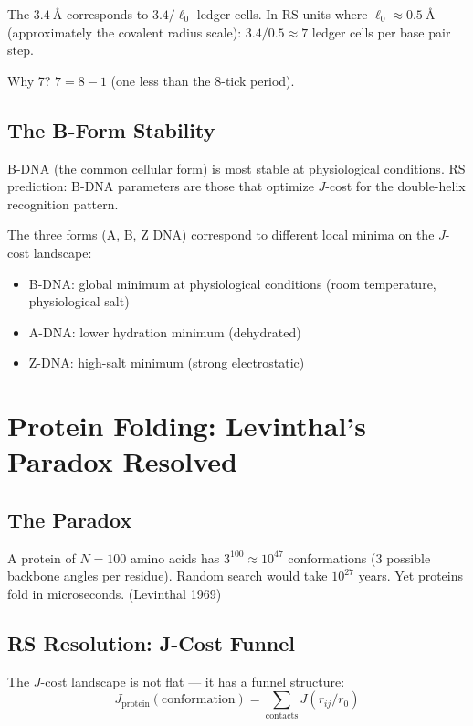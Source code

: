 \documentclass[12pt,a4paper]{article}
\theoremstyle{definition}
\theoremstyle{remark}
\begin{document}
The $3.4~\text{\AA}$ corresponds to $3.4/\ell_0$ ledger cells. In RS units where 
$\ell_0 \approx 0.5~\text{\AA}$ (approximately the covalent radius scale):
$3.4/0.5 \approx 7$ ledger cells per base pair step.

Why 7? $7 = 8 - 1$ (one less than the 8-tick period).

\subsection{The B-Form Stability}

B-DNA (the common cellular form) is most stable at physiological conditions.
RS prediction: B-DNA parameters are those that optimize $J$-cost for the 
double-helix recognition pattern.

The three forms (A, B, Z DNA) correspond to different local minima on the 
$J$-cost landscape:
\begin{itemize}
\item B-DNA: global minimum at physiological conditions (room temperature, physiological salt)
\item A-DNA: lower hydration minimum (dehydrated)
\item Z-DNA: high-salt minimum (strong electrostatic)
\end{itemize}

\section{Protein Folding: Levinthal's Paradox Resolved}

\subsection{The Paradox}

A protein of $N = 100$ amino acids has $3^{100} \approx 10^{47}$ conformations 
(3 possible backbone angles per residue). Random search would take $10^{27}$ years.
Yet proteins fold in microseconds. (Levinthal 1969)

\subsection{RS Resolution: J-Cost Funnel}

The $J$-cost landscape is not flat — it has a funnel structure:
\begin{equation}
J_\mathrm{protein}(\mathrm{conformation}) = \sum_\mathrm{contacts} J(r_{ij}/r_0)
\end{equation}
\end{document}
